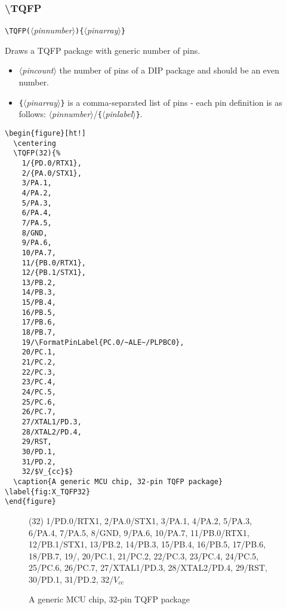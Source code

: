 \documentclass[english,a4paper,10pt]{article}
\newcommand\argu[1]{$\langle$\textit{#1}$\rangle$}
\newcommand\ARGU[1]{\texttt{\{}\argu{#1}\texttt{\}}}
\newcommand\arguD[1]{\texttt{(}\argu{#1}\texttt{)}}
\newcommand\verbinline{\lstinline[basicstyle=\normalsize\ttfamily]}
\begin{document}
\subsubsection{\ttfamily\textbackslash TQFP}
\verbinline|\TQFP|\arguD{pinnumber}\ARGU{pinarray}
\smallskip

Draws a TQFP package with generic number of pins.

\begin{itemize}
	\item \argu{pincount} the  number of pins of a DIP package and should be an even number.
	\item \ARGU{pinarray} is a comma-separated list of pins  - each pin definition is as follows: \argu{pinnumber}/\ARGU{pinlabel}.
\end{itemize}

\begin{minipage}[t]{0.65\linewidth}
\begin{lstlisting}
\begin{figure}[ht!]
  \centering
  \TQFP(32){%
  	1/{PD.0/RTX1},
  	2/{PA.0/STX1},
  	3/PA.1,										
  	4/PA.2,										
  	5/PA.3,										
  	6/PA.4,										
  	7/PA.5,										
  	8/GND,									
  	9/PA.6,
  	10/PA.7,
  	11/{PB.0/RTX1},
  	12/{PB.1/STX1},
  	13/PB.2,										
  	14/PB.3,										
  	15/PB.4,										
  	16/PB.5,										
  	17/PB.6,										
  	18/PB.7,										
  	19/\FormatPinLabel{PC.0/~ALE~/PLPBC0},
  	20/PC.1,										
  	21/PC.2,										
  	22/PC.3,										
  	23/PC.4,										
  	24/PC.5,										
  	25/PC.6,									
  	26/PC.7,
  	27/XTAL1/PD.3,
  	28/XTAL2/PD.4,
  	29/RST,
  	30/PD.1,										
  	31/PD.2,										
  	32/$V_{cc}$}								
  \caption{A generic MCU chip, 32-pin TQFP package} \label{fig:X_TQFP32}
\end{figure}
\end{lstlisting}%
\end{minipage}\hfill

\begin{figure}[ht!]
  \centering
  \TQFP(32){%
  	1/{PD.0/RTX1},
  	2/{PA.0/STX1},
  	3/PA.1,										
  	4/PA.2,										
  	5/PA.3,										
  	6/PA.4,										
  	7/PA.5,										
  	8/GND,									
  	9/PA.6,										
  	10/PA.7,										
  	11/{PB.0/RTX1},
  	12/{PB.1/STX1},
  	13/PB.2,
  	14/PB.3,
  	15/PB.4,
  	16/PB.5,
  	17/PB.6,
  	18/PB.7,
  	19/,
  	20/PC.1,
  	21/PC.2,
  	22/PC.3,
  	23/PC.4,
  	24/PC.5,
  	25/PC.6,
  	26/PC.7,
  	27/XTAL1/PD.3,
  	28/XTAL2/PD.4,
  	29/RST,
  	30/PD.1,
  	31/PD.2,
  	32/$V_{cc}$}
  \caption{A generic MCU chip, 32-pin TQFP package} \label{fig:X_TQFP32}
\end{figure}
\end{document}
